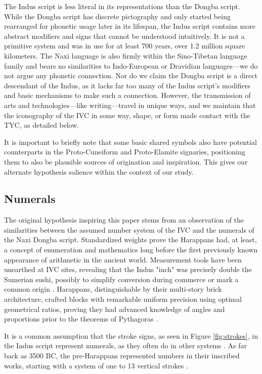 \documentclass[11pt,a4paper,oneside]{report}
\begin{document}
The Indus script is less literal in its representations than the Dongba script. While the Dongba script has discrete pictography and only started being rearranged for phonetic usage later in its lifespan, the Indus script contains more abstract modifiers and signs that cannot be understood intuitively. It is not a primitive system and was in use for at least 700 years, over 1.2 million square kilometers. The Naxi language is also firmly within the Sino-Tibetan language family and bears no similarities to Indo-European or Dravidian languages—we do not argue any phonetic connection. Nor do we claim the Dongba script is a direct descendant of the Indus, as it lacks far too many of the Indus script's modifiers and basic mechanisms to make such a connection. However, the transmission of arts and technologies—like writing—travel in unique ways, and we maintain that the iconography of the IVC in some way, shape, or form made contact with the TYC, as detailed below.

It is important to briefly note that some basic shared symbols also have potential counterparts in the Proto-Cuneiform and Proto-Elamite signaries, positioning them to also be plausible sources of origination and inspiration. This gives our alternate hypothesis salience within the context of our study.

\subsection{Numerals}
\noindent\hspace{1cm}
The original hypothesis inspiring this paper stems from an observation of the similarities between the assumed number system of the IVC and the numerals of the Naxi Dongba script. Standardized weights prove the Harappans had, at least, a concept of enumeration and mathematics long before the first previously known appearance of arithmetic in the ancient world. Measurement tools have been unearthed at IVC sites, revealing that the Indus "inch" was precisely double the Sumerian sushi, possibly to simplify conversion during commerce or mark a common origin \cite{singh_early_2019}. Harappans, distinguishable by their multi-story brick architecture, crafted blocks with remarkable uniform precision using optimal geometrical ratios, proving they had advanced knowledge of angles and proportions prior to the theorems of Pythagoras \cite{ghanta_overview_2020, khan_bricks_2013}. 

It is a common assumption that the stroke signs, as seen in Figure \ref{fig:strokes}, in the Indus script represent numerals, as they often do in other systems \cite{parpola_deciphering_1994, korvink_indus_2011, wells_epigraphic_2011}. As far back as 3500 BC, the pre-Harappans represented numbers in their inscribed works, starting with a system of one to 13 vertical strokes \cite{ghanta_overview_2020}.
\end{document}
